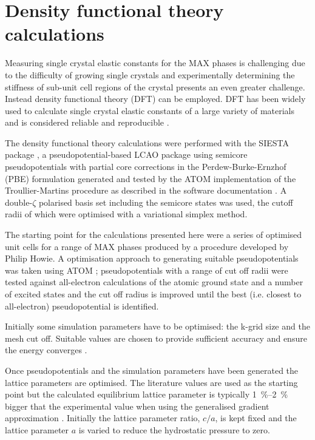\section{Density functional theory calculations}
\label{sec:DFT_method}



Measuring single crystal elastic constants for the MAX phases is challenging due to the difficulty of growing single crystals and experimentally determining the stiffness of sub-unit cell regions of the crystal presents an even greater challenge. Instead density functional theory (DFT) can be employed. DFT has been widely used to calculate single crystal elastic constants of a large variety of materials and is considered reliable and reproducible \cite{Lejaeghere2016}. 

The density functional theory calculations were performed with the SIESTA package \cite{soler2002}, a pseudopotential-based LCAO package using semicore pseudopotentials with partial core corrections in the Perdew-Burke-Ernzhof (PBE) formulation generated and tested by the ATOM implementation \cite{soler2002} of the Troullier-Martins procedure \cite{Troullier1991,Troullier1991a} as described in the software documentation \cite{ATOM_manual}. A double-$\zeta$ polarised basis set including the semicore states was used, the cutoff radii of which were optimised with a variational simplex method.

The starting point for the calculations presented here were a series of optimised unit cells for a range of MAX phases produced by a procedure developed by Philip Howie. A optimisation approach to generating suitable pseudopotentials was taken using ATOM \cite{ATOM_manual}; pseudopotentials with a range of cut off radii were tested against all-electron calculations of the atomic ground state and a number of excited states and the cut off radius is improved until the best (i.e. closest to all-electron) pseudopotential is identified. 

Initially some simulation parameters have to be optimised: the k-grid size and the mesh cut off. Suitable values are chosen to provide sufficient accuracy and ensure the energy converges \cite{SIESTA_manual}.

Once pseudopotentials and the simulation parameters have been generated the lattice parameters are optimised. The literature values are used as the starting point but the calculated equilibrium lattice parameter is typically \SIrange{1}{2}{\percent} bigger that the experimental value when using the generalised gradient approximation \cite{Staroverov2004,Wu2006,Staroverov2008erratum}. Initially the lattice parameter ratio, $c/a$, is kept fixed and the lattice parameter $a$ is varied to reduce the hydrostatic pressure to zero.

